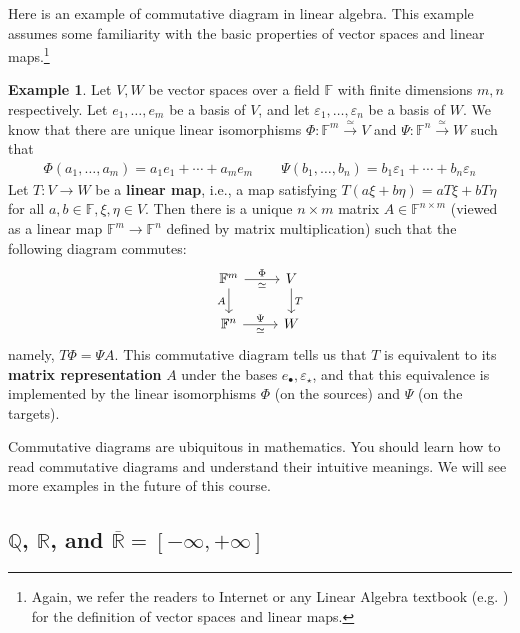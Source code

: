 \documentclass[12pt,b5paper,notitlepage]{article}
\theoremstyle{definition}
\newtheorem{eg}[df]{Example}
\theoremstyle{plain}
\newcommand{\blt}{\bullet}
\newcommand{\Qbb}{\mathbb Q}
\newcommand{\Rbb}{\mathbb R}
\newcommand{\Fbb}{\mathbb F}
\newcommand{\eps}{\varepsilon}
\numberwithin{equation}{section}
\begin{document}
Here is an example of commutative diagram in linear algebra. This example assumes some familiarity with the basic properties of vector spaces  and linear maps.\footnote{Again, we refer the readers to Internet or any Linear Algebra textbook (e.g. \cite{Axl}) for the definition of vector spaces and linear maps.}


\begin{eg}\label{lb67}
Let $V,W$ be vector spaces over a field $\Fbb$ with finite dimensions $m,n$ respectively. Let $e_1,\dots,e_m$ be a basis of $V$, and let $\eps_1,\dots,\eps_n$ be a basis of $W$. We know that there are unique linear isomorphisms $\Phi:\Fbb^m\xrightarrow{\simeq} V$ and $\Psi:\Fbb^n\xrightarrow{\simeq} W$ such that
\begin{align*}
\Phi(a_1,\dots,a_m)=a_1e_1+\cdots+a_me_m\qquad \Psi(b_1,\dots,b_n)=b_1\eps_1+\cdots+b_n\eps_n
\end{align*}
Let $T:V\rightarrow W$ be a  \textbf{linear map}, i.e., a map satisfying $T(a\xi+b\eta)=aT\xi+bT\eta$ for all $a,b\in\Fbb,\xi,\eta\in V$. Then there is a unique $n\times m$ matrix $A\in\Fbb^{n\times m}$ \index{Fnm@$\Fbb^{n\times m}$, the set of $n\times m$ matrices} (viewed as a linear map $\Fbb^m\rightarrow\Fbb^n$ defined by matrix multiplication) such that the following diagram commutes:
\begin{equation}
\begin{tikzcd}
\Fbb^m \arrow[r,"\Phi","\simeq"'] \arrow[d,"A"'] & V \arrow[d,"T"] \\
\Fbb^n \arrow[r,"\Psi","\simeq"']           & W          
\end{tikzcd}
\end{equation} 
namely, $T\Phi=\Psi A$. This commutative diagram tells us that $T$ is equivalent to its \textbf{matrix representation}  $A$ under the bases $e_\blt,\eps_\star$, and that this equivalence is implemented by the linear isomorphisms $\Phi$ (on the sources) and $\Psi$ (on the targets). 
\end{eg}

Commutative diagrams are ubiquitous in mathematics. You should learn how to read commutative diagrams and understand their intuitive meanings. We will see more examples in the future of this course.



\subsection{$\Qbb$, $\Rbb$, and $\overline{\mathbb R}=[-\infty,+\infty]$}
\end{document}
